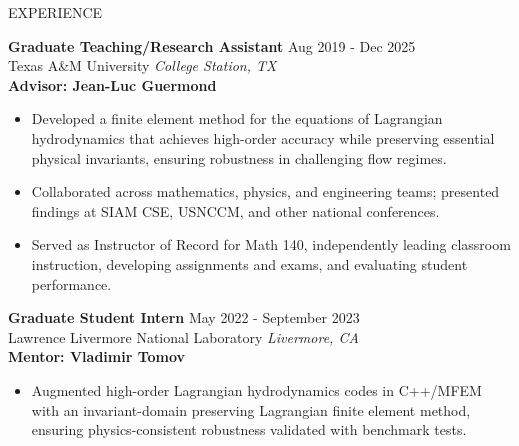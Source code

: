 \documentclass{resume} %
\begin{document}

\begin{rSection}{\stitle}

{\summary}


\end{rSection}


\begin{rSection}{EXPERIENCE}

\textbf{Graduate Teaching/Research Assistant} \hfill Aug 2019 - Dec 2025\\
Texas A\&M University \hfill \textit{College Station, TX}\\
{\bf Advisor: Jean-Luc Guermond}
 \begin{itemize}
    \item Developed a finite element method for the equations of Lagrangian hydrodynamics that achieves high-order accuracy while preserving essential physical invariants, ensuring robustness in challenging flow regimes.
    \item Collaborated across mathematics, physics, and engineering teams; presented findings at SIAM CSE, USNCCM, and other national conferences.
    \item Served as Instructor of Record for Math 140, independently leading classroom instruction, developing assignments and exams, and evaluating student performance.
 \end{itemize}
\vspace{1em}
\textbf{Graduate Student Intern} \hfill May 2022 - September 2023\\
Lawrence Livermore National Laboratory \hfill \textit{Livermore,  CA} \\
{\bf Mentor: Vladimir Tomov}
\begin{itemize}
    \item Augmented high-order Lagrangian hydrodynamics codes in C++/MFEM with an invariant-domain preserving Lagrangian finite element method, ensuring physics-consistent robustness validated with benchmark tests.


\end{itemize}
\end{rSection}
\end{document}
